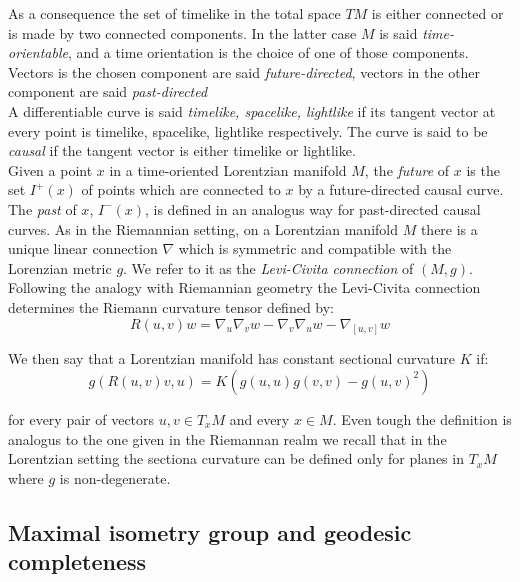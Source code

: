 As a consequence the set of timelike in the total space $TM$ is either connected or is made by two connected components. In the latter case $M$ is said \textit{time-orientable}, and a time orientation is the choice of one of those components. Vectors is the chosen component are said     \textit{future-directed}, vectors in the other component are said \textit{past-directed}\\
A differentiable curve is said \textit{timelike, spacelike, lightlike} if its tangent vector at every point is timelike, spacelike, lightlike respectively. The curve is said to be \textit{causal} if the tangent vector is either timelike or lightlike. \\ Given a point $x$ in a time-oriented Lorentzian manifold $M$, the \textit{future} of $x$ is the set $I^+(x)$ of points which are connected to $x$ by a future-directed causal curve. The \textit{past} of $x$, $I^-(x)$, is defined in an analogus way for past-directed causal curves. 
As in the Riemannian setting, on a Lorentzian manifold $M$ there is a unique linear connection $\nabla$ which is symmetric and compatible with the Lorenzian metric $g$. We refer to it as the \textit{Levi-Civita connection} of $(M,g)$.\\ Following the analogy with Riemannian geometry the Levi-Civita connection determines the Riemann curvature tensor defined by: 
\[
    R(u,v)w=\nabla_u\nabla_v w-\nabla_v\nabla_u w-\nabla_{[u,v]}w
\]  

We then say that a Lorentzian manifold has constant sectional curvature $K$ if: 
\begin{equation}\label{sectionalcurvature}
    g(R(u,v)v,u)=K(g(u,u)g(v,v)-g(u,v)^2) 
\end{equation}
    


for every pair of vectors $u,v \in T_{x}M$ and every $x\in M$. Even tough the definition is analogus to the one given in the Riemannan realm we recall that in the Lorentzian setting the sectiona curvature can be defined only for planes in $T_{x}M$ where $g$ is non-degenerate. 

\subsection{Maximal isometry group and geodesic completeness} 

